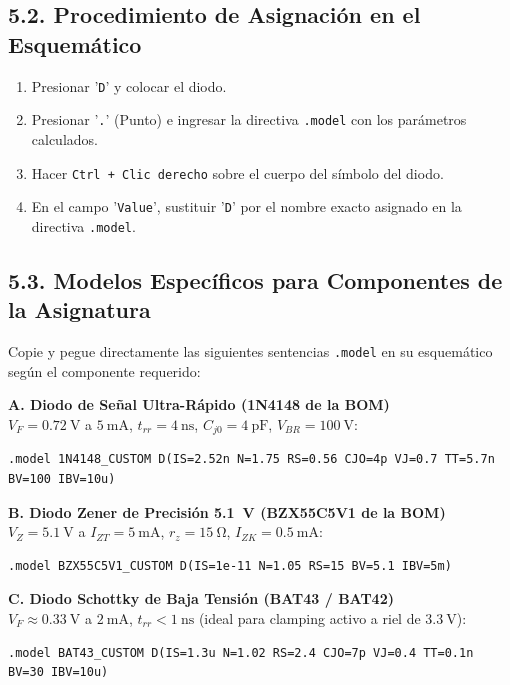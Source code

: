 \documentclass[11pt, a4paper]{article}
\begin{document}
\subsection{5.2. Procedimiento de Asignación en el Esquemático}
\begin{enumerate}
    \item Presionar '\texttt{D}' y colocar el diodo.
    \item Presionar '\texttt{.}' (Punto) e ingresar la directiva \texttt{.model} con los parámetros calculados.
    \item Hacer \texttt{Ctrl + Clic derecho} sobre el cuerpo del símbolo del diodo.
    \item En el campo '\texttt{Value}', sustituir '\texttt{D}' por el nombre exacto asignado en la directiva \texttt{.model}.
\end{enumerate}

\subsection{5.3. Modelos Específicos para Componentes de la Asignatura}
Copie y pegue directamente las siguientes sentencias \texttt{.model} en su esquemático según el componente requerido:

\textbf{A. Diodo de Señal Ultra-Rápido (1N4148 de la BOM)}\\
$V_F = \qty{0.72}{\volt}$ a $\qty{5}{\milli\ampere}$, $t_{rr} = \qty{4}{\nano\second}$, $C_{j0} = \qty{4}{\pico\farad}$, $V_{BR} = \qty{100}{\volt}$:
\begin{lstlisting}[style=spicestyle]
.model 1N4148_CUSTOM D(IS=2.52n N=1.75 RS=0.56 CJO=4p VJ=0.7 TT=5.7n BV=100 IBV=10u)
\end{lstlisting}

\textbf{B. Diodo Zener de Precisión \qty{5.1}{\volt} (BZX55C5V1 de la BOM)}\\
$V_Z = \qty{5.1}{\volt}$ a $I_{ZT} = \qty{5}{\milli\ampere}$, $r_z = \qty{15}{\ohm}$, $I_{ZK} = \qty{0.5}{\milli\ampere}$:
\begin{lstlisting}[style=spicestyle]
.model BZX55C5V1_CUSTOM D(IS=1e-11 N=1.05 RS=15 BV=5.1 IBV=5m)
\end{lstlisting}

\textbf{C. Diodo Schottky de Baja Tensión (BAT43 / BAT42)}\\
$V_F \approx \qty{0.33}{\volt}$ a $\qty{2}{\milli\ampere}$, $t_{rr} < \qty{1}{\nano\second}$ (ideal para clamping activo a riel de $\qty{3.3}{\volt}$):
\begin{lstlisting}[style=spicestyle]
.model BAT43_CUSTOM D(IS=1.3u N=1.02 RS=2.4 CJO=7p VJ=0.4 TT=0.1n BV=30 IBV=10u)
\end{lstlisting}
\end{document}
